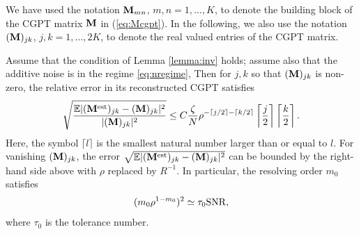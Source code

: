 We have used the notation $\mathbf{M}_{mn}$, $m,n=1, \ldots, K$, to
denote the building block of the CGPT matrix $\mathbf{M}$ in
(\ref{eq:Mcgpt}). In the following, we also use the notation
$(\mathbf{M})_{jk}$, $j,k=1, \ldots, 2K$, to denote the real valued
entries of the CGPT matrix.

\begin{theorem} Assume that the condition of Lemma \ref{lemma:inv} holds; assume also that the additive noise is in the regime \eqref{eq:nregime}, Then for $j,k$ so that $(\mathbf{M})_{jk}$ is non-zero, the relative error in its reconstructed CGPT satisfies
\begin{equation}
\sqrt{\frac{\mathbb{E} |(\mathbf{M}^{\mathrm{est}})_{jk} -
(\mathbf{M})_{jk}|^2}{|(\mathbf{M})_{jk}|^2}} \le C
\frac{\zeta}{N} \rho^{-\lceil j/2 \rceil -
\lceil k/2 \rceil} \left\lceil \frac{j}{2} \right\rceil
\left\lceil \frac{k}{2} \right\rceil. \label{eq:rerrM}
\end{equation}
Here, the symbol $\lceil l \rceil$ is the smallest natural number
larger than or equal to $l$. For vanishing $(\mathbf{M})_{jk}$, the
error $\sqrt{\mathbb{E}  |(\mathbf{M}^{\mathrm{est}})_{jk} -
(\mathbf{M})_{jk}|^2}$ can be bounded by the right-hand side above
with $\rho$ replaced by $R^{-1}$. In particular, the resolving
order $m_0$ satisfies
\begin{equation}
(m_0 \rho^{1-m_0})^2 \simeq \tau_0 \mathrm{SNR}, \label{eq:snrest}
\end{equation}
where $\tau_0$ is the tolerance number.
\end{theorem}

